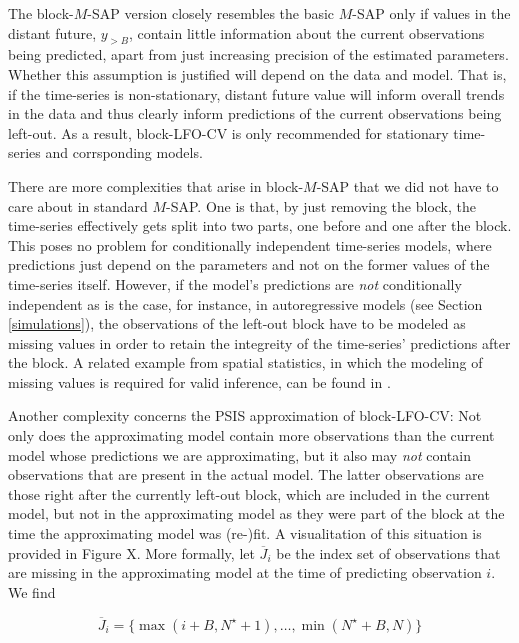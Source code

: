 \documentclass[american,]{article}
\begin{document}
The block-\(M\)-SAP version closely resembles the basic \(M\)-SAP only if values in
the distant future, \(y_{>B}\), contain little information about the current
observations being predicted, apart from just increasing precision of the
estimated parameters. Whether this assumption is justified will depend
on the data and model. That is, if the time-series is non-stationary, distant
future value will inform overall trends in the data and thus clearly inform
predictions of the current observations being left-out. As a result,
block-LFO-CV is only recommended for stationary time-series and corrsponding
models.

There are more complexities that arise in block-\(M\)-SAP that we did not have to
care about in standard \(M\)-SAP. One is that, by just removing the block, the
time-series effectively gets split into two parts, one before and one after the
block. This poses no problem for conditionally independent time-series models,
where predictions just depend on the parameters and not on the former values of
the time-series itself. However, if the model's predictions are \emph{not}
conditionally independent as is the case, for instance, in autoregressive models
(see Section \ref{simulations}), the observations of the left-out block have to
be modeled as missing values in order to retain the integreity of the
time-series' predictions after the block. A related example from spatial
statistics, in which the modeling of missing values is required for valid
inference, can be found in
\citet{buerkner:non-factorizable}.

Another complexity concerns the PSIS approximation of block-LFO-CV: Not only
does the approximating model contain more observations than the current model
whose predictions we are approximating, but it also may \emph{not} contain
observations that are present in the actual model. The latter observations are
those right after the currently left-out block, which are included in the
current model, but not in the approximating model as they were part of the block
at the time the approximating model was (re-)fit. A visualitation of this
situation is provided in Figure X. More formally, let \(\overline{J}_i\) be the
index set of observations that are missing in the approximating model at the
time of predicting observation \(i\). We find

\begin{equation}
\overline{J}_i = \{ \max(i + B, N^\star + 1), \ldots, \min(N^\star + B, N) \}
\end{equation}
\end{document}
